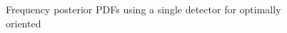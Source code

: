 \documentclass[showpacs, superscriptaddress, showpacs, letterpaper, showkeys,
preprintnumbers, altaffilletter, amssymb, amsmath, amsfonts, prd,
onecolumn, floatfix, nofootinbib]{revtex4-1}
\begin{document}
\begin{figure}
\begin{subfigure}{.4\textwidth}
\end{subfigure}
%                                                
\begin{subfigure}{.4\textwidth}
{\label{fig:freqpdfs15Mpc}}
\end{subfigure}
\begin{subfigure}{.4\textwidth}
{\label{fig:freqpdfs20Mpc}}
\end{subfigure}
\caption{Frequency posterior PDFs using a single detector for optimally oriented
}
\end{figure}
\end{document}
